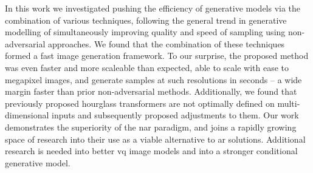 
In this work we investigated pushing the efficiency of generative models via the
combination of various techniques, following the general trend in generative
modelling of simultaneously improving quality and speed of sampling using
non-adversarial approaches. We found that the combination of these techniques
formed a fast image generation framework. To our surprise, the proposed method
was even faster and more scaleable than expected, able to scale with ease to
megapixel images, and generate samples at such resolutions in seconds -- a wide
margin faster than prior non-adversarial methods. Additionally, we found that
previously proposed hourglass transformers are not optimally defined on
multi-dimensional inputs and subsequently proposed adjustments to them. Our work
demonstrates the superiority of the \acrlong{nar} paradigm, and joins a rapidly
growing space of research into their use as a viable alternative to \acrlong{ar}
solutions. Additional research is needed into better \gls{vq} image models and
into a stronger conditional generative model.


